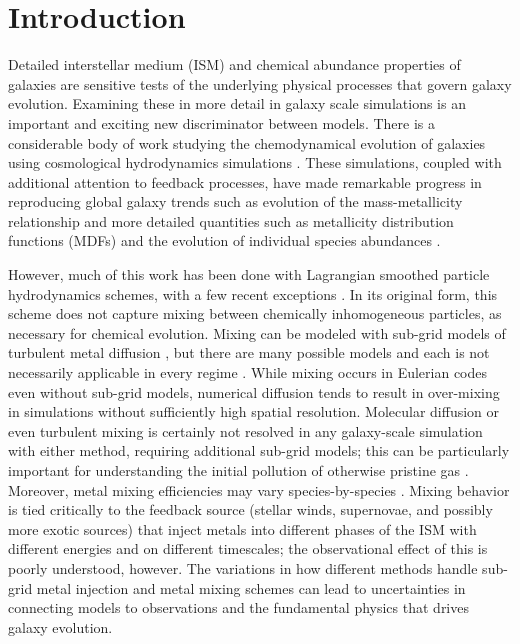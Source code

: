 \section{Introduction}
Detailed interstellar medium (ISM) and chemical abundance properties of galaxies are sensitive tests of the underlying physical processes that govern galaxy evolution. Examining these in more detail in galaxy scale simulations is an important and exciting new discriminator between models. There is a considerable body of work studying the chemodynamical evolution of galaxies using cosmological hydrodynamics simulations \citep[e.g.][]{OppenheimerDave2008,Wiersma2009,Shen2010,Simpson2013,Snaith2015,OWLS,EAGLE,FIRE}.
These simulations, coupled with additional attention to feedback processes, have made remarkable progress in reproducing global galaxy trends such as evolution of the mass-metallicity relationship \citep[e.g.][]{Obreja2014, Ma2016, Dave2017, Torrey2017} and more detailed quantities such as metallicity distribution functions (MDFs) and the evolution of individual species abundances \citep{Marcolini2008,Revaz2009,Sawala2010,RevazJablonka2012,Jeon2017,Hirai2017} .

However, much of this work has been done with Lagrangian smoothed particle hydrodynamics schemes, with a few recent exceptions  \citep{Few2012,Simpson2013,Few2014,Vorobyov2015,Corlies2018}. In its original form, this scheme does not capture mixing between chemically inhomogeneous particles, as necessary for chemical evolution. Mixing can be modeled with sub-grid models of turbulent metal diffusion \citep[e.g.][]{Shen2010,Shen2013,Brook2014,Su2017a,Escala2018}, but there are many possible models and each is not necessarily applicable in every regime \citep[see ][]{Revaz2016}. While mixing occurs in Eulerian codes even without sub-grid models, numerical diffusion tends to result in over-mixing in simulations without sufficiently high spatial resolution. Molecular diffusion or even turbulent mixing is certainly not resolved in any galaxy-scale simulation with either method, requiring additional sub-grid models; this can be particularly important for understanding the initial pollution of otherwise pristine gas \citep[see ][ and references therein]{PanScannapiecoScalo2013,Sarmento2017}. Moreover, metal mixing efficiencies may vary species-by-species \citep[e.g.][]{Cohen2013, Roederer2014, FrebelNorris2015, Hirai2017, Cote2018, KrumholzTing2018}. Mixing behavior is tied critically to the feedback source (stellar winds, supernovae, and possibly more exotic sources) that inject metals into different phases of
the ISM with different energies and on different timescales; the observational effect of this is poorly understood, however. The variations in how different methods handle sub-grid metal injection and metal mixing schemes can lead to uncertainties in connecting models to observations and the fundamental physics that drives galaxy evolution.

